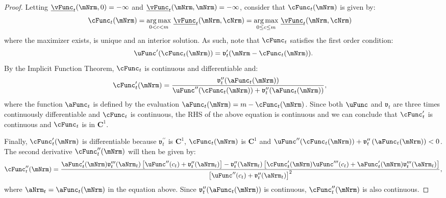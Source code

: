 \documentclass[\econtexRoot/BufferStockTheory]{subfiles}
\begin{document}
\begin{proof}
Letting $\underline{\vFunc}_{t}(\mNrm,0) = -\infty$ and  $\underline{\vFunc}_{t}(\mNrm,\mNrm) = -\infty$,  consider that $\cFunc_{t}(\mNrm)$ is given by:
%
\begin{equation*}\begin{gathered}\begin{aligned}
      \cFunc_{t}(\mNrm)  & = \underset{0<c<m}{\arg \max }~\underline{\vFunc}_{t}(\mNrm,\cNrm)= \underset{0\leq c \leq m}{\arg \max }~\underline{\vFunc}_{t}(\mNrm,\cNrm)
    \end{aligned}\end{gathered}\end{equation*}
where the maximizer exists, is unique and an interior solution.
As such, note that $\cFunc_{t}$ satisfies the first order condition:
%
\begin{equation*}\label{eq:uprimcFOC}
  \uFunc^{\prime }(\cFunc_{t}(\mNrm))=\mathfrak{v}_{t}^{\prime }(\mNrm-\cFunc_{t}(\mNrm)).
\end{equation*}
%
By the Implicit Function Theorem, $\cFunc_{t}$ is continuous and differentiable and:
%
\begin{equation*}\label{eq:derivativeConsFunc}\begin{gathered}\begin{aligned}
      \cFunc_{t}^{\prime }(\mNrm)  & = \frac{\mathfrak{v}_{t}^{\prime \prime }({\aFunc}_{t}(\mNrm))  }{\uFunc^{\prime \prime }(\cFunc_{t}(\mNrm))+\mathfrak{v}_{t}^{\prime \prime }({\aFunc}_{t}(\mNrm))},
    \end{aligned}\end{gathered}\end{equation*}
%
where the function $\aFunc_{t}$ is defined by the evaluation $\aFunc_{t}(\mNrm) = m- \cFunc_{t}(\mNrm)$.
Since both $\uFunc$ and $\mathfrak{v}_{t}$ are
three times continuously differentiable and $\cFunc_{t}$ is continuous, the RHS of the above equation is continuous and we can conclude that
$\cFunc_{t}^{\prime }$ is continuous and $\cFunc_{t}$ is in $\mathbf{C}^{1}$.

Finally, $\cFunc_{t}^{\prime }(\mNrm)$ is differentiable because
$\mathfrak{v}_{t}^{\prime \prime }$ is $\mathbf{C}^{1}$, $ \cFunc_{t}(\mNrm)$
is $\mathbf{C}^{1}$ and $\uFunc^{\prime \prime
}(\cFunc_{t}(\mNrm))+\mathfrak{v}_{t}^{\prime \prime }\left( {\aFunc}_{t}(\mNrm)\right)
<0$.
The second derivative $\cFunc_{t}^{\prime \prime }(\mNrm)$ will then be given by:
%
\begin{equation*}
  \cFunc_{t}^{\prime \prime }(\mNrm)=\frac{{\aFunc}_{t}^{\prime }(\mNrm)\mathfrak{v}_{t}^{\prime \prime
      \prime }({\aNrm}_{t})\left[ \uFunc^{\prime \prime }(c_{t})+\mathfrak{v}_{t}^{\prime \prime }({\aNrm}_{t})
    \right] -\mathfrak{v}_{t}^{\prime \prime }({\aNrm}_{t})\left[ \cFunc_{t}^{\prime }(\mNrm)\uFunc^{\prime \prime
        \prime }(c_{t})+{\aFunc}_{t}^{\prime }(\mNrm)\mathfrak{v}_{t}^{\prime \prime \prime }({\aNrm}_{t})\right] }{
    {\left[ \uFunc^{\prime \prime }(c_{t})+\mathfrak{v}_{t}^{\prime \prime }({\aNrm}_{t})\right]}^{2}},
\end{equation*}
%
where $\aNrm_{t} = \aFunc_{t}(\mNrm)$ in the equation above.
Since $\mathfrak{v}_{t}^{\prime \prime }({\aFunc}_{t}(\mNrm))$ is continuous,
$\cFunc_{t}^{\prime \prime }(\mNrm)$ is also continuous.


\end{proof}
\end{document}
